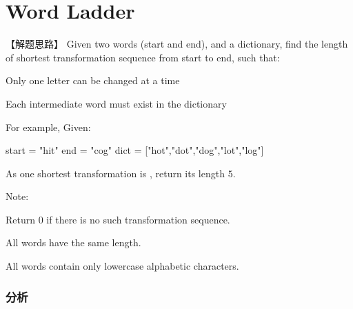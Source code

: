 \section{Word Ladder} %
\label{sec:word-ladder}


【解题思路】
Given two words (start and end), and a dictionary, find the length of shortest transformation sequence from start to end, such that:
\begindot
\item Only one letter can be changed at a time
\item Each intermediate word must exist in the dictionary
\myenddot

For example, Given:

\begin{Code}
	start = "hit"
	end = "cog"
	dict = ["hot","dot","dog","lot","log"]
\end{Code}
As one shortest transformation is , return its length $5$.

Note:
\begindot
\item Return 0 if there is no such transformation sequence.
\item All words have the same length.
\item All words contain only lowercase alphabetic characters.
\myenddot


\subsubsection{分析}


